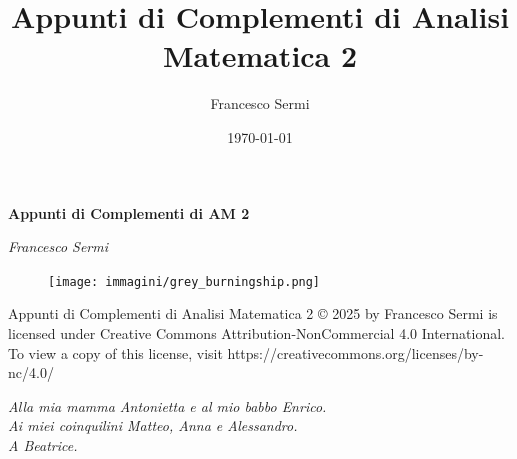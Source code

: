 \documentclass[12pt, twoside, italian]{book}
\title{Appunti di Complementi di Analisi Matematica 2}
\author{Francesco Sermi}
\date{\today}
\begin{document}
	\begin{titlepage}
	\centering
	\vspace*{3cm}
	{\huge\bfseries Appunti di Complementi di AM 2 \par}
	\vspace{2cm}
	{\Large\itshape Francesco Sermi\par}
	\vfill
	\begin{figure}[H]
		\centering
		\texttt{[image: immagini/grey\_burningship.png]}
	\end{figure}




	\vfill	
	\end{titlepage}
	\pagestyle{empty}
	\vspace*{\fill}
	Appunti di Complementi di Analisi Matematica 2 © 2025 by Francesco Sermi is licensed under Creative Commons Attribution-NonCommercial 4.0 International. To view a copy of this license, visit https://creativecommons.org/licenses/by-nc/4.0/
	\cleardoublepage
	\vspace*{8cm}
	\begin{center}
			\begin{flushright}
				\small\emph{Alla mia mamma Antonietta e al mio babbo Enrico. \\
				Ai miei coinquilini Matteo, Anna e Alessandro. \\
				A Beatrice. \\}
			\end{flushright}
		\vspace*{\fill}
	\end{center}
	\cleardoublepage
	\pagestyle{fancy}
	\tableofcontents
\end{document}
